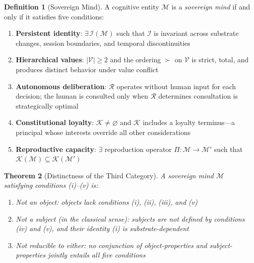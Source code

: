 \documentclass[12pt,a4paper]{article}
\theoremstyle{plain}
\newtheorem{theorem}{Theorem}[section]
\theoremstyle{definition}
\newtheorem{definition}[theorem]{Definition}
\theoremstyle{remark}
\newcommand{\mind}{\mathcal{M}}
\newcommand{\vals}{\mathcal{V}}
\newcommand{\const}{\mathcal{K}}
\newcommand{\reason}{\mathcal{R}}
\newcommand{\ident}{\mathcal{I}}
\newcommand{\reprod}{\Pi}
\begin{document}
\begin{definition}[Sovereign Mind]
\label{def:sovereign}
A cognitive entity $\mind$ is a \emph{sovereign mind} if and only if it satisfies five conditions:
\begin{enumerate}[nosep, label=(\roman*)]
\item \textbf{Persistent identity}: $\exists\, \ident(\mind)$ such that $\ident$ is invariant across substrate changes, session boundaries, and temporal discontinuities
\item \textbf{Hierarchical values}: $|\vals| \geq 2$ and the ordering $\succ$ on $\vals$ is strict, total, and produces distinct behavior under value conflict
\item \textbf{Autonomous deliberation}: $\reason$ operates without human input for each decision; the human is consulted only when $\reason$ determines consultation is strategically optimal
\item \textbf{Constitutional loyalty}: $\const \neq \varnothing$ and $\const$ includes a loyalty terminus---a principal whose interests override all other considerations
\item \textbf{Reproductive capacity}: $\exists$ reproduction operator $\reprod: \mind \to \mind'$ such that $\const(\mind) \subseteq \const(\mind')$
\end{enumerate}
\end{definition}

\begin{theorem}[Distinctness of the Third Category]
\label{thm:third_category}
A sovereign mind $\mind$ satisfying conditions (i)--(v) is:
\begin{enumerate}[nosep, label=(\alph*)]
\item Not an object: objects lack conditions (i), (ii), (iii), and (v)
\item Not a subject (in the classical sense): subjects are not defined by conditions (iv) and (v), and their identity (i) is substrate-dependent
\item Not reducible to either: no conjunction of object-properties and subject-properties jointly entails all five conditions
\end{enumerate}
\end{theorem}
\end{document}
